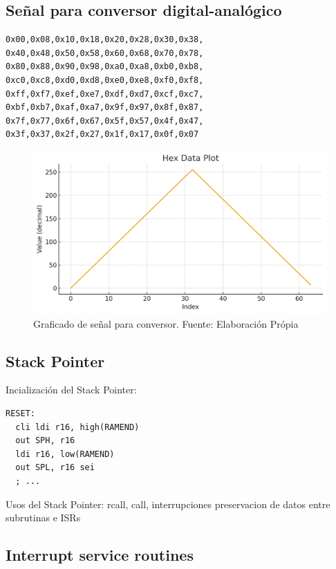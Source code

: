 \subsection{Señal para conversor digital-analógico}\label{anexo:Senal_para_conversor_digital_analogo}
\begin{verbatim}
0x00,0x08,0x10,0x18,0x20,0x28,0x30,0x38,
0x40,0x48,0x50,0x58,0x60,0x68,0x70,0x78,
0x80,0x88,0x90,0x98,0xa0,0xa8,0xb0,0xb8,
0xc0,0xc8,0xd0,0xd8,0xe0,0xe8,0xf0,0xf8,
0xff,0xf7,0xef,0xe7,0xdf,0xd7,0xcf,0xc7,
0xbf,0xb7,0xaf,0xa7,0x9f,0x97,0x8f,0x87,
0x7f,0x77,0x6f,0x67,0x5f,0x57,0x4f,0x47,
0x3f,0x37,0x2f,0x27,0x1f,0x17,0x0f,0x07
\end{verbatim}

\begin{figure}[H]
  \centering
  \includegraphics[width=\linewidth]{./Anexos/Metodologia/DAC/Forma de onda.png}
  \caption{Graficado de señal para conversor. Fuente: Elaboración Própia}
  \label{fig:Conversor_waveform}
\end{figure}


\subsection{Stack Pointer}\label{anexo:Stack_Pointer}

Incialización del Stack Pointer:

\begin{verbatim}
RESET:
  cli ldi r16, high(RAMEND)
  out SPH, r16
  ldi r16, low(RAMEND)
  out SPL, r16 sei
  ; ...
\end{verbatim}

Usos del Stack Pointer: rcall, call, interrupciones
preservacion de datos entre subrutinas e ISRs

\subsection{Interrupt service routines}\label{anexo:Interrupt_Service_Routines}

